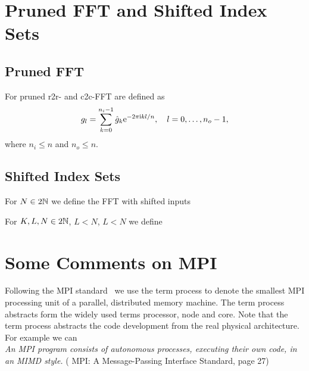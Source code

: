 \section{Pruned FFT and Shifted Index Sets}
\subsection{Pruned FFT}
For pruned r2r- and c2c-FFT are defined as
\begin{equation*}
  g_l = \sum_{k=0}^{n_i-1} \hat g_k \mathrm{e}^{-2\pi{\ensuremath{\text{\scriptsize{i}}}} kl/n}, \quad l=0,\hdots,n_o-1,
\end{equation*}
where $n_i\le n$ and $n_o\le n$.

\subsection{Shifted Index Sets}
For $N\in 2\mathbb{N}$ we define the FFT with shifted inputs


For $K,L,N\in 2\mathbb{N}$, $L<N$, $L<N$ we define








\section{Some Comments on MPI}
Following the MPI standard~\cite{MPI-2.2} we use the term process to denote the smallest MPI processing unit of a parallel, distributed memory machine.
The term process abstracts form the widely used terms processor, node and core.
Note that the term process abstracts the code development from the real physical architecture. For example we can \\

\emph{An MPI program consists of autonomous processes, executing their own code, in an MIMD style.}
( MPI: A Message-Passing Interface Standard, page 27)



